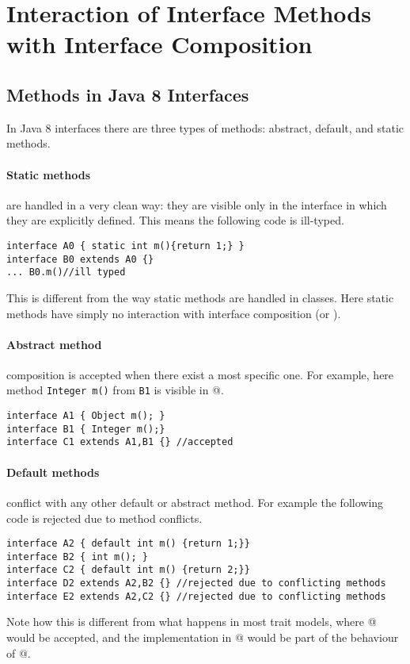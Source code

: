 \section{Interaction of Interface Methods with Interface Composition}


\subsection{Methods in Java 8 Interfaces}
In Java 8 interfaces there are three types of methods: abstract, default, and
static methods.

\paragraph{Static methods} are handled in a very clean way: they are visible only in
  the interface in which they are explicitly defined. This means the following code
  is ill-typed.
\begin{lstlisting}
interface A0 { static int m(){return 1;} }
interface B0 extends A0 {}
... B0.m()//ill typed
\end{lstlisting}
This is different from the way static methods are handled in classes. Here
static methods have simply no interaction with interface
composition (\Q@extends@ or \Q@implements@).

\paragraph{Abstract method} composition is accepted when there exist a most specific one.
  For example, here method \texttt{Integer m()} from \texttt{B1} is visible in @.
\begin{lstlisting}
interface A1 { Object m(); }
interface B1 { Integer m();}
interface C1 extends A1,B1 {} //accepted
\end{lstlisting}

\paragraph{Default methods} conflict with any other default or abstract method. For
  example the following code is rejected due to method conflicts.
\begin{lstlisting}
interface A2 { default int m() {return 1;}}
interface B2 { int m(); }
interface C2 { default int m() {return 2;}}
interface D2 extends A2,B2 {} //rejected due to conflicting methods
interface E2 extends A2,C2 {} //rejected due to conflicting methods
\end{lstlisting}
Note how this is different from what happens in most trait models, where @
would be accepted, and the implementation in @ would be part of the
behaviour of @.

